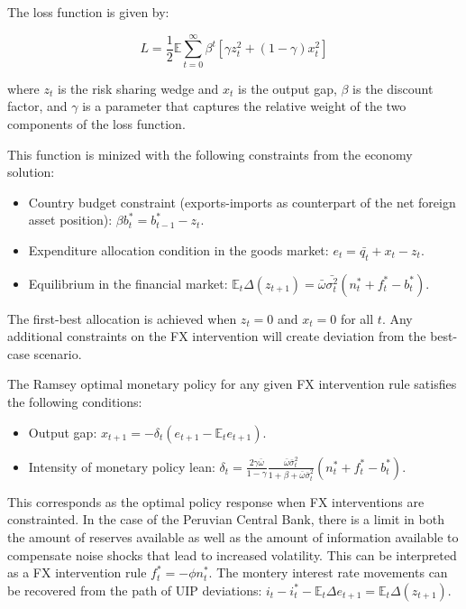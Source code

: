 \documentclass[12pt,a4paper]{article}
\begin{document}
The loss function is given by:

\begin{equation}
    L = \frac{1}{2}\mathbb{E}\sum_{t=0}^{\infty} \beta^t \left[ \gamma z_t^2 + (1-\gamma) x_t^2 \right]
\end{equation}

where $z_t$ is the risk sharing wedge and $x_t$ is the output gap, $\beta$ is the discount factor, and $\gamma$ is a parameter that captures the relative weight of the two components of the loss function.

This function is minized with the following constraints from the economy solution:

\begin{itemize}
    \item Country budget constraint (exports-imports as counterpart of the net foreign asset position): 
    $\beta b_t^* = b_{t-1}^* - z_t$.
    
    \item Expenditure allocation condition in the goods market: 
    $e_t = \bar{q_t} + x_t - z_t$.
    
    \item Equilibrium in the financial market:
    $\mathbb{E}_t \Delta (z_{t+1}) = \bar{\omega} \bar{\sigma_t^2} (n_t^* + f_t^* - b_t^*)$.

\end{itemize}

The first-best allocation is achieved when $z_t = 0$ and $x_t = 0$ for all $t$. Any additional constraints on the FX intervention will create deviation from the best-case scenario. 

The Ramsey optimal monetary policy for any given FX intervention rule satisfies the following conditions:

\begin{itemize}
    \item Output gap: $x_{t+1} = -\delta_t (e_{t+1} - \mathbb{E}_t e_{t+1})$.
    \item Intensity of monetary policy lean: $\delta_t = \frac{2 \gamma \bar{\omega}}{1 - \gamma} \frac{\bar{\omega} \bar{\sigma}_t^2}{1 + \beta + \bar{\omega} \bar{\sigma}_t^2} (n_t^* + f_t^* - b_t^*)$.
\end{itemize}
    
This corresponds as the optimal policy response when FX interventions are constrainted. In the case of the Peruvian Central Bank, there is a limit in both the amount of reserves available as well as the amount of information available to compensate noise shocks that lead to increased volatility. This can be interpreted as a FX intervention rule $f_t^* = -\phi n_t^*$. The montery interest rate movements can be recovered from the path of UIP deviations: $i_t - i_t^* - \mathbb{E}_t \Delta e_{t+1} = \mathbb{E}_t \Delta (z_{t+1})$.
\end{document}
